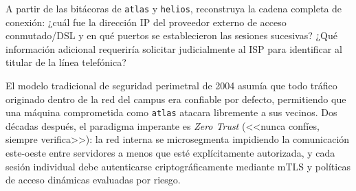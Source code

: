 \begin{retoforense}
A partir de las bitácoras de \texttt{atlas} y \texttt{helios}, reconstruya la cadena completa de conexión: ¿cuál fue la dirección IP del proveedor externo de acceso conmutado/DSL y en qué puertos se establecieron las sesiones sucesivas? ¿Qué información adicional requeriría solicitar judicialmente al ISP para identificar al titular de la línea telefónica?
\end{retoforense}

\begin{perspectiva20}
El modelo tradicional de seguridad perimetral de 2004 asumía que todo tráfico originado dentro de la red del campus era confiable por defecto, permitiendo que una máquina comprometida como \texttt{atlas} atacara libremente a sus vecinos. Dos décadas después, el paradigma imperante es \textit{Zero Trust} (<<nunca confíes, siempre verifica>>): la red interna se microsegmenta impidiendo la comunicación este-oeste entre servidores a menos que esté explícitamente autorizada, y cada sesión individual debe autenticarse criptográficamente mediante mTLS y políticas de acceso dinámicas evaluadas por riesgo.
\end{perspectiva20}

